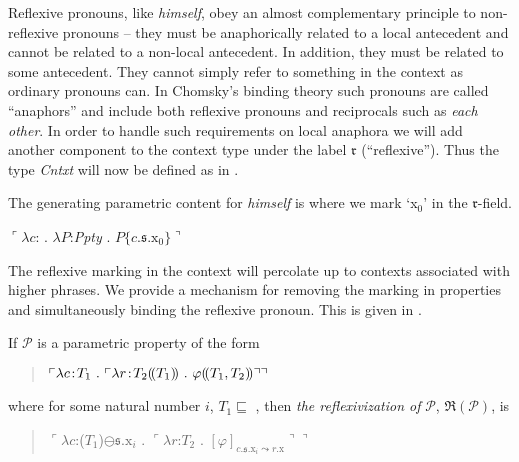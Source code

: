 Reflexive pronouns, like \textit{himself}, obey an almost
complementary principle to non-reflexive pronouns -- they must be
anaphorically related to a local antecedent and cannot be related to a
non-local antecedent.  In addition, they must be related to some
antecedent.  They cannot simply refer to something in the context as
ordinary pronouns can.  In Chomsky's binding theory such pronouns are
called ``anaphors'' and include both reflexive pronouns and
reciprocals such as \textit{each other}.  In order to handle such
requirements on local anaphora we will add another component to the
context type under the label $\mathfrak{r}$ (``reflexive''). Thus the
type \textit{Cntxt} will  now be defined as in \nexteg{}.
\begin{ex} 
\end{ex}
The generating parametric content for \textit{himself} is \nexteg{}
where we mark `x$_0$' in the $\mathfrak{r}$-field.
\begin{ex} 
  $\ulcorner\lambda c$: . $\lambda
  P$:\textit{Ppty} . $P\{c.\mathfrak{s}.\text{x}_0\}\urcorner$
\end{ex}
The reflexive marking in the context will percolate up to contexts
associated with higher phrases.  We provide a mechanism for removing
the marking in properties and simultaneously binding the reflexive
pronoun.  This is given in \nexteg{}.
\begin{ex} 
  If $\mathcal{P}$ is a parametric property of the form
  \begin{quote}
    $\ulcorner\lambda c\!:\!T_1\ .\ \ulcorner\lambda
    r\!:\!T_2\dep{T_1}\ .\ \varphi\dep{T_1,T_2}\urcorner\urcorner$
  \end{quote}
  where for some natural number $i$, $T_1\sqsubseteq$ , then \textit{the reflexivization
  of} $\mathcal{P}$, $\mathfrak{R}(\mathcal{P})$, is
  \begin{quote}
    $\ulcorner\lambda c$:($T_1$\fbox{\d{$\wedge$}})$\ominus\mathfrak{s}.\text{x}_i$
    . $\ulcorner\lambda r$:$T_2$
    . $[\varphi]_{c.\mathfrak{s}.\text{x}_i\leadsto
      r.\text{x}}\urcorner\urcorner$
  \end{quote}
  
\end{ex} 
